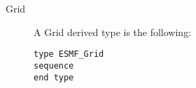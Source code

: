 

\begin{description}

\item [Grid] A Grid derived type is the following:
\begin{verbatim}
type ESMF_Grid
sequence
end type
\end{verbatim}


\end{description}



